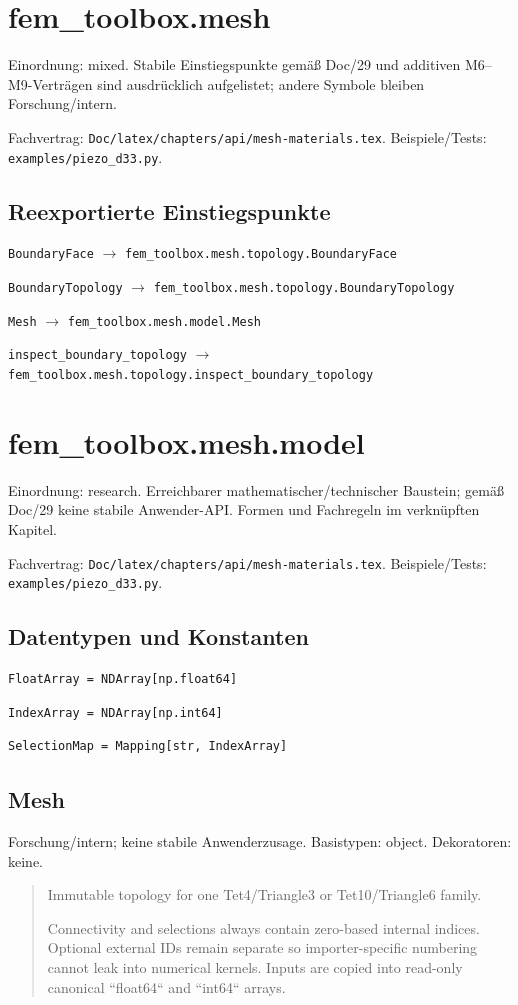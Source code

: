 \section{fem\_toolbox.mesh}
Einordnung: mixed. Stabile Einstiegspunkte gemäß Doc/29 und additiven M6–M9-Verträgen sind ausdrücklich aufgelistet; andere Symbole bleiben Forschung/intern.
\par Fachvertrag: \nolinkurl{Doc/latex/chapters/api/mesh-materials.tex}. Beispiele/Tests:
\nolinkurl{examples/piezo_d33.py}.
\subsection*{Reexportierte Einstiegspunkte}
\noindent\nolinkurl{BoundaryFace} $\to$ \nolinkurl{fem_toolbox.mesh.topology.BoundaryFace}\par
\noindent\nolinkurl{BoundaryTopology} $\to$ \nolinkurl{fem_toolbox.mesh.topology.BoundaryTopology}\par
\noindent\nolinkurl{Mesh} $\to$ \nolinkurl{fem_toolbox.mesh.model.Mesh}\par
\noindent\nolinkurl{inspect_boundary_topology} $\to$ \nolinkurl{fem_toolbox.mesh.topology.inspect_boundary_topology}\par
\section{fem\_toolbox.mesh.model}
Einordnung: research. Erreichbarer mathematischer/technischer Baustein; gemäß Doc/29 keine stabile Anwender-API. Formen und Fachregeln im verknüpften Kapitel.
\par Fachvertrag: \nolinkurl{Doc/latex/chapters/api/mesh-materials.tex}. Beispiele/Tests:
\nolinkurl{examples/piezo_d33.py}.
\subsection*{Datentypen und Konstanten}
\begin{lstlisting}
FloatArray = NDArray[np.float64]
\end{lstlisting}
\begin{lstlisting}
IndexArray = NDArray[np.int64]
\end{lstlisting}
\begin{lstlisting}
SelectionMap = Mapping[str, IndexArray]
\end{lstlisting}
\subsection{Mesh}
Forschung/intern; keine stabile Anwenderzusage.
Basistypen: object. Dekoratoren: keine.
\begin{quote}
Immutable topology for one Tet4/Triangle3 or Tet10/Triangle6 family.\par Connectivity and selections always contain zero-based internal indices. Optional external IDs remain separate so importer-specific numbering cannot leak into numerical kernels. Inputs are copied into read-only canonical ``float64`` and ``int64`` arrays.
\end{quote}
